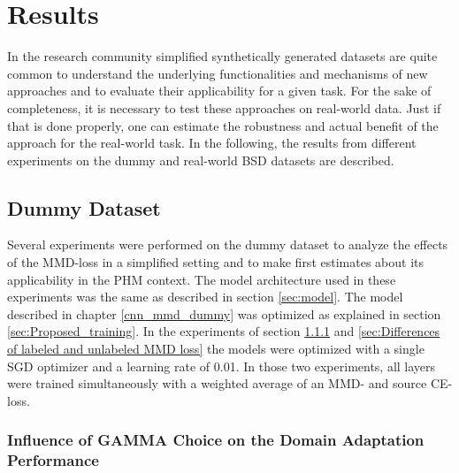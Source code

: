 \chapter{Results}\label{chapter:results}
In the research community simplified synthetically generated datasets are quite common to understand the underlying functionalities and mechanisms of new approaches and to evaluate their applicability for a given task. For the sake of completeness, it is necessary to test these approaches on real-world data. Just if that is done properly, one can estimate the robustness and actual benefit of the approach for the real-world task. In the following, the results from different experiments on the dummy and real-world BSD datasets are described.

\section{Dummy Dataset}\label{sec:results_dummy_dataset}
Several experiments were performed on the dummy dataset to analyze the effects of the MMD-loss in a simplified setting and to make first estimates about its applicability in the PHM context. The model architecture used in these experiments was the same as described in section \ref{sec:model}. The model described in chapter \ref{cnn_mmd_dummy} was optimized as explained in section \ref{sec:Proposed_training}. In the experiments of section \ref{sec:Balancing Cross-Entropy and MMD loss} and \ref{sec:Differences of labeled and unlabeled MMD loss} the models were optimized with a single SGD optimizer and a learning rate of 0.01. In those two experiments, all layers were trained simultaneously with a weighted average of an MMD- and source CE-loss.

\subsection{Influence of GAMMA Choice on the Domain Adaptation Performance} \label{sec:Balancing Cross-Entropy and MMD loss}

